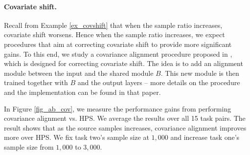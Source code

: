 \paragraph{Covariate shift.}
Recall from Example \ref{ex_covshift} that when the sample ratio increases, covariate shift worsens.
Hence when the sample ratio increases, we expect procedures that aim at correcting covariate shift to provide more significant gains.
To this end, we study a covariance alignment procedure proposed in \citet{WZR20}, which is designed for correcting covariate shift.
The idea is to add an alignment module between the input and the shared module $B$.
This new module is then trained together with $B$ and the output layers -- more details on the procedure and the implementation can be found in that paper.

In Figure \ref{fig_ab_cov}, we measure the performance gains from performing covariance alignment vs. HPS.
We average the results over all 15 task pairs.
The result shows that as the source samples increases, covariance alignment improves more over HPS.
We fix task two's sample size at $1,000$ and increase task one's sample size from $1,000$ to $3,000$.



